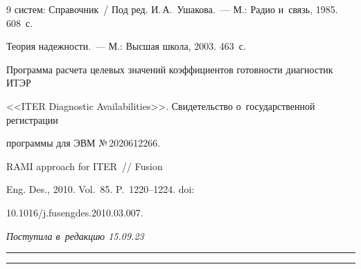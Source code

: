 {{\begin{thebibliography}{9}
систем: Справочник~/ Под ред. И.\,А.~Ушакова.~--- М.: Радио и~связь, 1985. 608~с.




 Теория надежности.~--- М.: Высшая школа, 2003. 463~с.




Программа расчета целевых значений коэффициентов готовности диагностик ИТЭР 


<<ITER Diagnostic Availabilities>>. Свидетельство о~государственной регистрации 


программы для ЭВМ №\,2020612266.




 RAMI approach for ITER~/\!\!/ Fusion 


Eng. Des., 2010. Vol.~85. P.~1220--1224. doi: 


10.1016\!/\!j.fusengdes.2010.03.007.


   \end{thebibliography}


} }











\vspace*{-6pt}





\hfill{\small\textit{Поступила в~редакцию 15.09.23}}





\vspace*{8pt}





\hrule





\vspace*{2pt}








\hrule





\vspace*{8pt}










